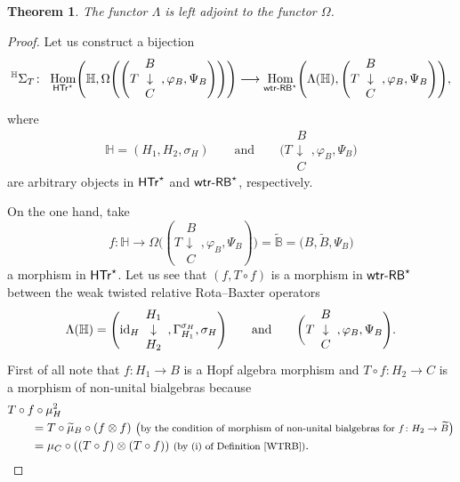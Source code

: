\documentclass[10pt,a4paper]{amsart}
\numberwithin{equation}{section}
\newtheorem{Theorem}{Theorem}[section]
\DeclareMathOperator{\Hom}{Hom}
\begin{document}
\begin{Theorem}\label{adjpair}
The functor $\Lambda$ is left adjoint to the functor $\Omega$.
\end{Theorem}
\begin{proof}
Let us construct a bijection
\begin{gather*}
{}^{\mathbb{H}}\Sigma_{T}\colon\ \Hom_{{\sf HTr}^{\star}}\Biggl(\mathbb{H},\Omega\Biggl(\Biggl(T\begin{array}{c}B\\\downarrow\\C\end{array},\varphi_{B},\Psi_{B}\Biggr)\Biggr)\Biggr)\longrightarrow \Hom_{{\sf wtr}\textnormal{-}{\sf RB}^{\star}}\Biggl(\Lambda(\mathbb{H}),\Biggl(T\begin{array}{c}B\\\downarrow\\C\end{array},\varphi_{B},\Psi_{B}\Biggr)\Biggr),
\end{gather*}
where
\[
\mathbb{H}=(H_{1},H_{2},\sigma_{H}) \qquad \text{and}\qquad \Biggl(T\begin{array}{c}B\\\downarrow\\C\end{array},\varphi_{B},\Psi_{B}\Biggr)
\]
 are arbitrary objects in ${\sf HTr}^{\star}$ and ${\sf wtr}\textnormal{-}{\sf RB}^{\star}$, respectively.

On the one hand, take
\[
f\colon \mathbb{H}\rightarrow \Omega\Biggl((T\begin{array}{c}B\\\downarrow\\C\end{array},\varphi_{B},\Psi_{B})\Biggr)=\widetilde{\mathbb{B}}=\bigl(B,\widetilde{B},\Psi_{B}\bigr)
\]
 a morphism in ${\sf HTr}^{\star}$. Let us see that $(f,T\circ f)$ is a morphism in ${\sf wtr}\textnormal{-}{\sf RB}^{\star}$ between the weak twisted relative Rota--Baxter operators \[
 \Lambda(\mathbb{H})=\Biggl({\rm id}_{H}\begin{array}{c}H_{1}\\\downarrow\\H_{2}\end{array},\Gamma_{H_{1}}^{\sigma_{H}},\sigma_{H}\Biggr)
 \qquad \text{and} \qquad \biggl(T\begin{array}{c}B\\\downarrow\\C\end{array},\varphi_{B},\Psi_{B}\Biggr).
 \]
 First of all note that $f\colon H_{1}\rightarrow B$ is a Hopf algebra morphism and $T\circ f\colon H_{2}\rightarrow C$ is a morphism of non-unital bialgebras because
\begin{align*}
&T\circ f\circ \mu_{H}^{2}\\
&\qquad{}=T\circ\widetilde{\mu}_{B}\circ (f\otimes f)\
\text{\footnotesize\textnormal{\big(by the condition of morphism of non-unital bialgebras for $f\colon H_{2}\rightarrow \widetilde{B}$\big)}}\\
&\qquad{}=\mu_{C}\circ((T\circ f)\otimes(T\circ f))\ \text{\footnotesize\textnormal{(by (i) of Definition \ref{WTRB})}}.
\end{align*}


\end{proof}
\end{document}
